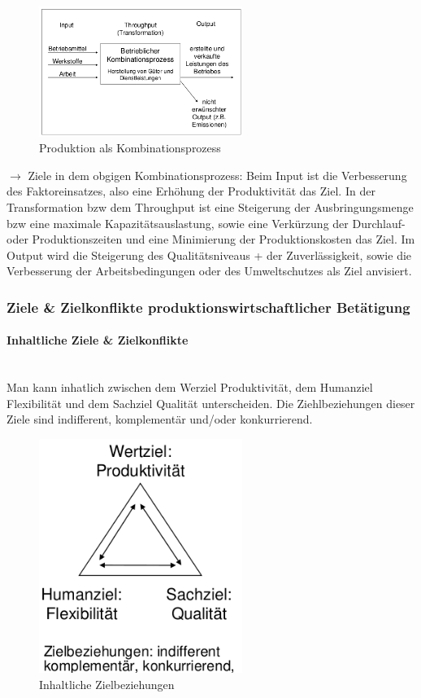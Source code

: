 \documentclass[11pt]{article}
\begin{document}
\begin{figure}[htbp]
\centering
\includegraphics[width=250px]{./pictures/produktion_als_kombpr.png}
\caption{Produktion als Kombinationsprozess}
\end{figure} 

\(\rightarrow\) Ziele in dem obgigen Kombinationsprozess:
Beim Input ist die Verbesserung des Faktoreinsatzes, also eine Erhöhung der Produktivität das Ziel.
In der Transformation bzw dem Throughput ist eine Steigerung der Ausbringungsmenge bzw eine maximale Kapazitätsauslastung, sowie eine Verkürzung der Durchlauf- oder Produktionszeiten und eine Minimierung der Produktionskosten das Ziel.
Im Output wird die Steigerung des Qualitätsniveaus + der Zuverlässigkeit, sowie die Verbesserung der Arbeitsbedingungen oder des Umweltschutzes als Ziel anvisiert.

\subsubsection{Ziele \& Zielkonflikte produktionswirtschaftlicher Betätigung}
\label{sec:org038c909}
\paragraph{Inhaltliche Ziele & Zielkonflikte}\\
Man kann inhatlich zwischen dem Werziel Produktivität, dem Humanziel Flexibilität und dem Sachziel Qualität unterscheiden. Die Ziehlbeziehungen dieser Ziele sind indifferent, komplementär und/oder konkurrierend.

\begin{figure}[htbp]
\centering
\includegraphics[width=250px]{./pictures/inhaltziele.png}
\caption{Inhaltliche Zielbeziehungen}
\end{figure} 
\end{document}
